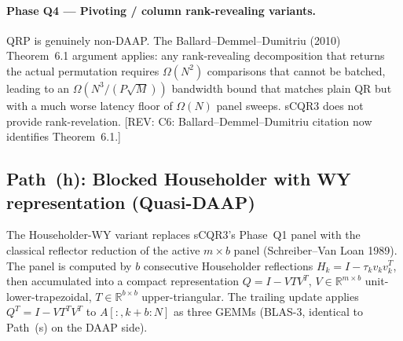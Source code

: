\documentclass[11pt]{article}
\newcommand{\REV}[1]{\textcolor{blue!60!black}{\small\textsf{[REV: #1]}}}
\begin{document}
\paragraph{Phase Q4 --- Pivoting / column rank-revealing variants.}
QRP is genuinely non-DAAP. The Ballard--Demmel--Dumitriu (2010)
Theorem~6.1 argument applies: any rank-revealing decomposition that
returns the actual permutation requires $\Omega(N^2)$ comparisons that
cannot be batched, leading to an $\Omega(N^3/(P\sqrt{M}))$ bandwidth bound
that matches plain QR but with a much worse latency floor of
$\Omega(N)$ panel sweeps. sCQR3 does not provide rank-revelation.
\REV{C6: Ballard--Demmel--Dumitriu citation now identifies Theorem~6.1.}

\subsection*{Path~(h): Blocked Householder with WY representation (Quasi-DAAP)}

The Householder-WY variant replaces sCQR3's Phase~Q1 panel with the
classical reflector reduction of the active $m \times b$ panel
(Schreiber--Van Loan 1989). The panel is computed by $b$ consecutive
Householder reflections $H_k = I - \tau_k v_k v_k^T$, then accumulated
into a compact representation $Q = I - V T V^T$, $V \in \mathbb{R}^{m
\times b}$ unit-lower-trapezoidal, $T \in \mathbb{R}^{b \times b}$
upper-triangular. The trailing update applies $Q^T = I - V T^T V^T$ to
$A[:, k+b:N]$ as three GEMMs (BLAS-3, identical to Path~(s) on the
DAAP side).
\end{document}
